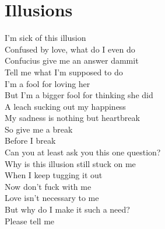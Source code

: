 \documentclass[12pt, b5paper]{article}
\begin{document}
\section{Illusions}
I'm sick of this illusion
\\Confused by love, what do I even do
\\Confucius give me an answer dammit
\\Tell me what I'm supposed to do
\\I'm a fool for loving her
\\But I'm a bigger fool for thinking she did
\\A leach sucking out my happiness
\\My sadness is nothing but heartbreak
\\So give me a break
\\Before I break
\\Can you at least ask you this one question?
\\Why is this illusion still stuck on me
\\When I keep tugging it out
\\Now don't fuck with me
\\Love isn't necessary to me
\\But why do I make it such a need?
\\Please tell me


\newpage 
\end{document}
